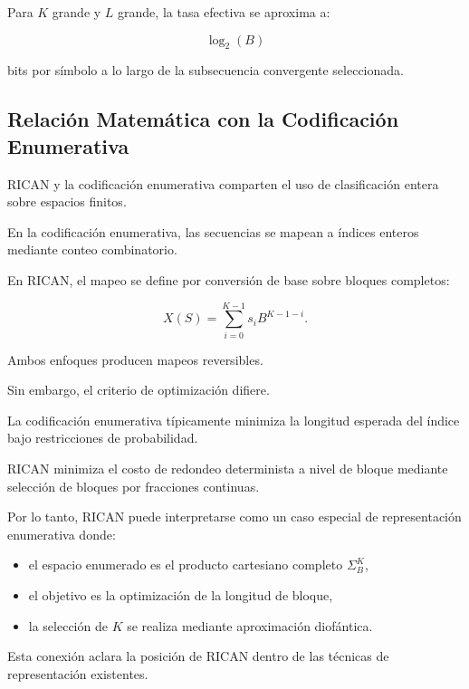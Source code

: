 \documentclass[onecolumn]{IEEEtran}
\begin{document}
Para $K$ grande y $L$ grande, la tasa efectiva se aproxima a:

\[
\log_2(B)
\]

bits por símbolo a lo largo de la subsecuencia convergente
seleccionada.

\subsection{Relación Matemática con la Codificación Enumerativa}

RICAN y la codificación enumerativa comparten el uso de clasificación
entera sobre espacios finitos.

En la codificación enumerativa, las secuencias se mapean a índices
enteros mediante conteo combinatorio.

En RICAN, el mapeo se define por conversión de base sobre bloques
completos:

\[
X(S)=\sum_{i=0}^{K-1}s_iB^{K-1-i}.
\]

Ambos enfoques producen mapeos reversibles.

Sin embargo, el criterio de optimización difiere.

La codificación enumerativa típicamente minimiza la longitud esperada
del índice bajo restricciones de probabilidad.

RICAN minimiza el costo de redondeo determinista a nivel de bloque
mediante selección de bloques por fracciones continuas.

Por lo tanto, RICAN puede interpretarse como un caso especial de
representación enumerativa donde:

\begin{itemize}

\item el espacio enumerado es el producto cartesiano completo
$\Sigma_B^K$,

\item el objetivo es la optimización de la longitud de bloque,

\item la selección de $K$ se realiza mediante aproximación
diofántica.

\end{itemize}

Esta conexión aclara la posición de RICAN dentro de las técnicas de
representación existentes.

\end{document}
